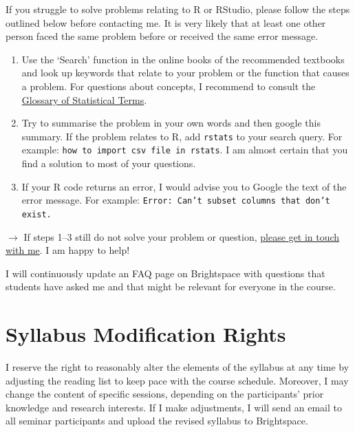 \documentclass[abstract=on,parskip=full,headings=standardclasses,fontsize=11pt,paper=a4]{scrartcl}
\begin{document}
If you struggle to solve problems relating to \textsf{R} or RStudio, please follow the steps outlined below before contacting me. It is very likely that at least one other person faced the same problem before or received the same error message. %
\begin{enumerate}
\item Use the `Search' function in the online books of the recommended textbooks \autocite{ismay20,wickham17,healy19} and look up keywords that relate to your problem or the function that causes a problem. For questions about concepts, I recommend to consult the \href{https://hbiostat.org/doc/glossary.pdf}{Glossary of Statistical Terms}.
\item Try to summarise the problem in your own words and then google this summary. If the problem relates to \textsf{R}, add \texttt{rstats} to your search query. For example: \texttt{how to import csv file in rstats}. I am almost certain that you find a solution to most of your questions. 
\item If your \textsf{R} code returns an error, I would advise you to Google the text of the error message.  For example: \texttt{Error: Can't subset columns that don't exist.}
\end{enumerate}

$\longrightarrow$ If steps 1--3 still do not solve your problem or question, \href{mailto:stefan.mueller@ucd.ie}{please get in touch with me}.  I am happy to help!

I will continuously update an FAQ page on Brightspace with questions that students have asked me and that might be relevant for everyone in the course. 



\section*{Syllabus Modification Rights}

I reserve the right to reasonably alter the elements of the syllabus at any time by adjusting the reading list to keep pace with the course schedule. Moreover, I may change the content of specific sessions, depending on the participants' prior knowledge and research interests. If I make adjustments, I will send an email to all seminar participants and upload the revised syllabus to Brightspace.


\tableofcontents
\end{document}

